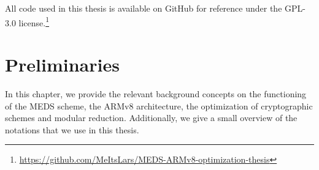 \documentclass[11pt,a4paper]{report}
\theoremstyle{definition}
\begin{document}
All code used in this thesis is available on GitHub for reference under the GPL-3.0 license.\footnote{\url{https://github.com/MeItsLars/MEDS-ARMv8-optimization-thesis}}


\chapter{Preliminaries}
\label{ch:preliminaries}
In this chapter, we provide the relevant background concepts on the functioning of the MEDS scheme, the ARMv8 architecture, the optimization of cryptographic schemes and modular reduction. Additionally, we give a small overview of the notations that we use in this thesis.
\end{document}
